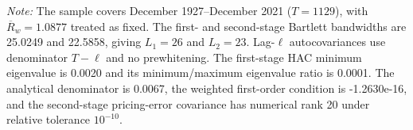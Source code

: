 \begin{table}[H]
\begin{minipage}{0.98\textwidth}
    \par\smallskip
    {\footnotesize\raggedright \textit{Note:} The sample covers December 1927--December 2021 ($T=1129$), with $\overline{R}_w=1.0877$ treated as fixed. The first- and second-stage Bartlett bandwidths are 25.0249 and 22.5858, giving $L_1=26$ and $L_2=23$. Lag-$\ell$ autocovariances use denominator $T-\ell$ and no prewhitening. The first-stage HAC minimum eigenvalue is 0.0020 and its minimum/maximum eigenvalue ratio is 0.0001. The analytical denominator is 0.0067, the weighted first-order condition is -1.2630e-16, and the second-stage pricing-error covariance has numerical rank 20 under relative tolerance $10^{-10}$.\par}
  \end{minipage}
\end{table}

